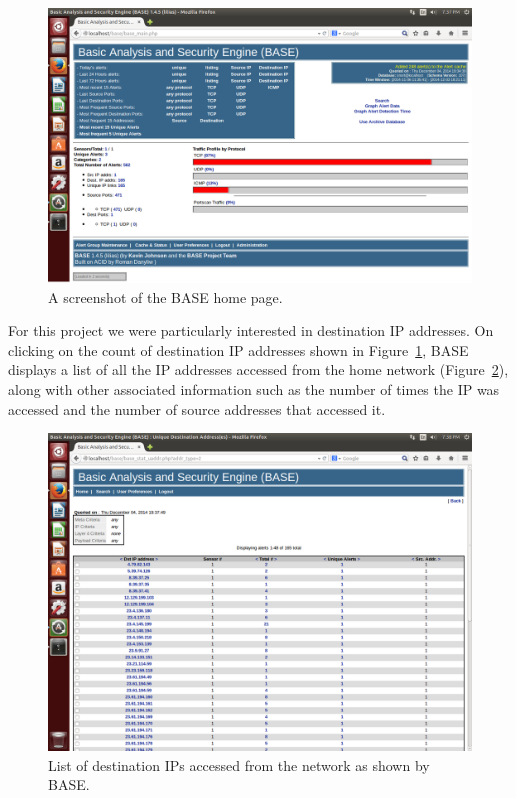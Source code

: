\begin{figure}[!t]
    \centering
    \includegraphics[width=1.7\columnwidth]{figures/R2_BASE_Main}
    \caption{A screenshot of the BASE home page.}
    \label{fig:r2}
\end{figure}

For this project we were particularly interested in destination IP
addresses.
%
On clicking on the count of destination IP addresses shown in
Figure~\ref{fig:r2}, BASE displays a list of all the IP addresses accessed from
the home network (Figure~\ref{fig:r3}), along with other associated information
such as the number of times the IP was accessed and the number of source
addresses that accessed it.

\begin{figure}[!tb]
    \centering
    \includegraphics[width=1.7\columnwidth]{figures/R3_BASE_IPList}
    \caption{List of destination IPs accessed from the network as shown by
    BASE.}
    \label{fig:r3}
\end{figure}

